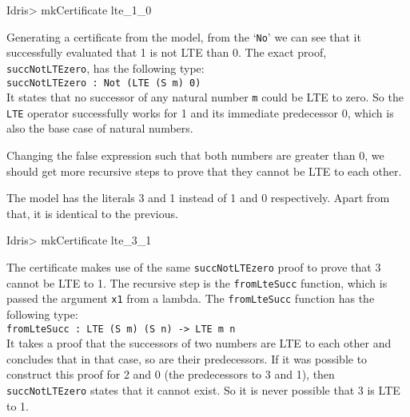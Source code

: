         \begin{code}
Idris> mkCertificate lte_1_0
        \end{code}
        
        Generating a certificate from the model, from the `\texttt{No}' we can see that it successfully evaluated that 1 is not LTE than 0. The exact proof, \texttt{succNotLTEzero}, has the following type:\\
        \texttt{succNotLTEzero : Not (LTE (S m) 0)}\\
        It states that no successor of any natural number \texttt{m} could be LTE to zero. So the \texttt{LTE} operator successfully works for 1 and its immediate predecessor 0, which is also the base case of natural numbers.
        
        \newpage
        
        
        
        Changing the false expression such that both numbers are greater than 0, we should get more recursive steps to prove that they cannot be LTE to each other.
        
        
        The \Idris model has the literals 3 and 1 instead of 1 and 0 respectively. Apart from that, it is identical to the previous.
        
        \begin{code}
Idris> mkCertificate lte_3_1
        \end{code}
        
        The certificate makes use of the same \texttt{succNotLTEzero} proof to prove that 3 cannot be LTE to 1. The recursive step is the \texttt{fromLteSucc} function, which is passed the argument \texttt{x1} from a lambda. The \texttt{fromLteSucc} function has the following type:\\
        \texttt{fromLteSucc : LTE (S m) (S n) -> LTE m n}\\
        It takes a proof that the successors of two numbers are LTE to each other and concludes that in that case, so are their predecessors. If it was possible to construct this proof for 2 and 0 (the predecessors to 3 and 1), then \texttt{succNotLTEzero} states that it cannot exist. So it is never possible that 3 is LTE to 1.
        \\
        
